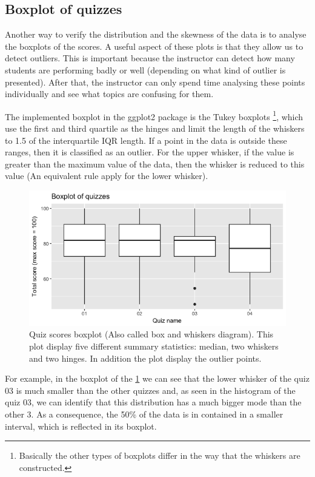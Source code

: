 \subsection{Boxplot of quizzes}

Another way to verify the distribution and the skewness of the data is to analyse the boxplots of the scores. A useful aspect of these plots is that they allow us to detect outliers. This is important because the instructor can detect how many students are performing badly or well (depending on what kind of outlier is presented). After that, the instructor can only spend time analysing these points individually and see what topics are confusing for them.

The implemented boxplot in the ggplot2 package \cite{ggplot2} is the Tukey boxplots \footnote{Basically the other types of boxplots differ in the way that the whiskers are constructed.}, which use the first and third quartile as the hinges and limit the length of the whiskers to 1.5 of the interquartile IQR length. If a point in the data is outside these ranges, then it is classified as an outlier. For the upper whisker, if the value is greater than the maximum value of the data, then the whisker is reduced to this value (An equivalent rule apply for the lower whisker). 

\begin{figure}[ht!]
  \centering
  \includegraphics[width=\linewidth]{img/quiz_boxplot.png}
  \caption{Quiz scores boxplot (Also called box and whiskers diagram). This plot display five different summary statistics: median, two whiskers and two hinges. In addition the plot display the outlier points.}
  \label{img:quiz_boxplot}
\end{figure}

For example, in the boxplot of the \cref{img:quiz_boxplot} we can see that the lower whisker of the quiz 03 is much smaller than the other quizzes and, as seen in the histogram of the quiz 03, we can identify that this distribution has a much bigger mode than the other 3. As a consequence, the 50\% of the data is in contained in a smaller interval, which is reflected in its boxplot.

